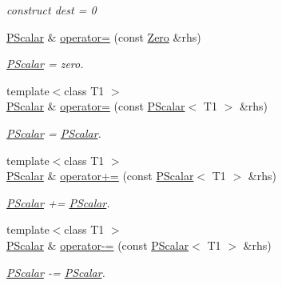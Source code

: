 \begin{DoxyCompactItemize}
\begin{DoxyCompactList}\small\item\em construct dest = 0 \end{DoxyCompactList}\item 
\mbox{\hyperlink{classENSEM_1_1PScalar}{P\+Scalar}} \& \mbox{\hyperlink{classENSEM_1_1PScalar_a4357d579e24371f6384da9008f4512b3}{operator=}} (const \mbox{\hyperlink{structENSEM_1_1Zero}{Zero}} \&rhs)
\begin{DoxyCompactList}\small\item\em \mbox{\hyperlink{classENSEM_1_1PScalar}{P\+Scalar}} = zero. \end{DoxyCompactList}\item 
{\footnotesize template$<$class T1 $>$ }\\\mbox{\hyperlink{classENSEM_1_1PScalar}{P\+Scalar}} \& \mbox{\hyperlink{classENSEM_1_1PScalar_ae69d6f1ad8ec0b65652f8d16c5f97b11}{operator=}} (const \mbox{\hyperlink{classENSEM_1_1PScalar}{P\+Scalar}}$<$ T1 $>$ \&rhs)
\begin{DoxyCompactList}\small\item\em \mbox{\hyperlink{classENSEM_1_1PScalar}{P\+Scalar}} = \mbox{\hyperlink{classENSEM_1_1PScalar}{P\+Scalar}}. \end{DoxyCompactList}\item 
{\footnotesize template$<$class T1 $>$ }\\\mbox{\hyperlink{classENSEM_1_1PScalar}{P\+Scalar}} \& \mbox{\hyperlink{classENSEM_1_1PScalar_a9c8d9e51f9d0a13b4b4aa9992812eea8}{operator+=}} (const \mbox{\hyperlink{classENSEM_1_1PScalar}{P\+Scalar}}$<$ T1 $>$ \&rhs)
\begin{DoxyCompactList}\small\item\em \mbox{\hyperlink{classENSEM_1_1PScalar}{P\+Scalar}} += \mbox{\hyperlink{classENSEM_1_1PScalar}{P\+Scalar}}. \end{DoxyCompactList}\item 
{\footnotesize template$<$class T1 $>$ }\\\mbox{\hyperlink{classENSEM_1_1PScalar}{P\+Scalar}} \& \mbox{\hyperlink{classENSEM_1_1PScalar_a8c0e633dbd87bcb922496bfaf136752c}{operator-\/=}} (const \mbox{\hyperlink{classENSEM_1_1PScalar}{P\+Scalar}}$<$ T1 $>$ \&rhs)
\begin{DoxyCompactList}\small\item\em \mbox{\hyperlink{classENSEM_1_1PScalar}{P\+Scalar}} -\/= \mbox{\hyperlink{classENSEM_1_1PScalar}{P\+Scalar}}. \end{DoxyCompactList}\item 

\end{DoxyCompactItemize}
